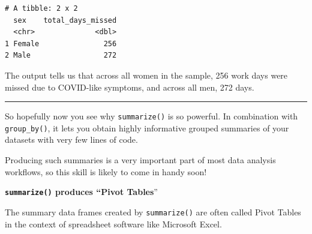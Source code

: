 \documentclass[
  letterpaper,
  DIV=11,
  numbers=noendperiod]{scrreprt}
\begin{document}
\begin{verbatim}
# A tibble: 2 x 2
  sex    total_days_missed
  <chr>              <dbl>
1 Female               256
2 Male                 272
\end{verbatim}

The output tells us that across all women in the sample, 256 work days
were missed due to COVID-like symptoms, and across all men, 272 days.

\begin{center}\rule{0.5\linewidth}{0.5pt}\end{center}

So hopefully now you see why \texttt{summarize()} is so powerful. In
combination with \texttt{group\_by()}, it lets you obtain highly
informative grouped summaries of your datasets with very few lines of
code.

Producing such summaries is a very important part of most data analysis
workflows, so this skill is likely to come in handy soon!

\begin{tcolorbox}[enhanced jigsaw, title=\textcolor{quarto-callout-note-color}{\faInfo}\hspace{0.5em}{Vocab}, colbacktitle=quarto-callout-note-color!10!white, leftrule=.75mm, arc=.35mm, opacityback=0, bottomrule=.15mm, rightrule=.15mm, toptitle=1mm, breakable, toprule=.15mm, colback=white, coltitle=black, colframe=quarto-callout-note-color-frame, bottomtitle=1mm, titlerule=0mm, left=2mm, opacitybacktitle=0.6]

\textbf{\texttt{summarize()} produces ``Pivot Tables}''

The summary data frames created by \texttt{summarize()} are often called
Pivot Tables in the context of spreadsheet software like Microsoft
Excel.

\end{tcolorbox}
\end{document}
